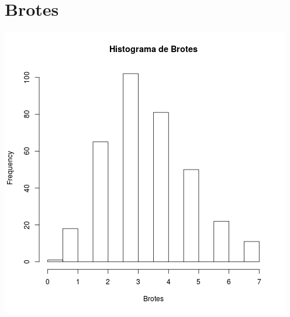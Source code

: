 \documentclass{article}
\begin{document}
\section{Brotes}

\includegraphics[width=\textwidth]{brotes_histograma.png}
\end{document}
